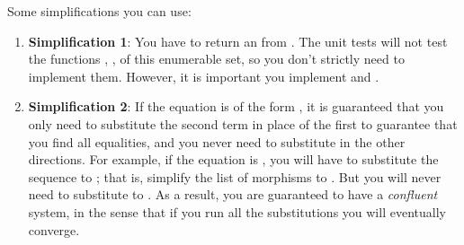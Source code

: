 Some simplifications you can use:

\begin{enumerate}
    \item  \textbf{Simplification 1}:
          You have to return an \EnumerableSet from .
          The unit tests will not test the functions , ,  of this enumerable set, so you don't strictly need to implement them.
          However, it is important you implement  and .
    \item \textbf{Simplification 2}:
          If the equation is of the form , it is guaranteed that you only need to substitute the second term in place of the first to guarantee that you find all equalities, and you never need to substitute in the other directions.
          For example, if the equation is , you will have to substitute the sequence \pystr{[d, e]} to \pystr{[a,b,c]}; that is, simplify the list of morphisms \pystr{[a,a,b,c,a]} to \pystr{[a,d,e,a]}.
          But you will never need to substitute \pystr{[a,b,c]} to \pystr{[d,e]}.
          As a result, you are guaranteed to have a \emph{confluent} system, in the sense that if you run all the substitutions you will eventually converge.

\end{enumerate}
